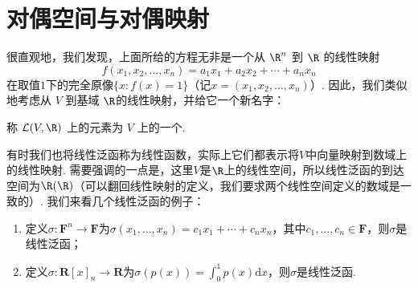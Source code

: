 






\section{对偶空间与对偶映射}

很直观地，我们发现，上面所给的方程无非是一个从 $\R^n$ 到 $\R$ 的线性映射
\[f(x_1, x_2, \ldots, x_n) = a_1 x_1 + a_2 x_2 + \cdots + a_n x_n\]
在取值$1$下的完全原像$\{x: f(x) = 1\}$（记$x=(x_1,x_2,\ldots,x_n)$）. 因此，我们类似地考虑从 $V$ 到基域 $\R$的线性映射，并给它一个新名字：

\begin{definition}{}{}
    称 $\mathcal{L}(V, \R)$ 上的元素为 $V$ 上的一个.
\end{definition}
有时我们也将线性泛函称为线性函数，实际上它们都表示将$V$中向量映射到数域上的线性映射. 需要强调的一点是，这里$V$是$\R$上的线性空间，所以线性泛函的到达空间为$\R(\R)$（可以翻回线性映射的定义，我们要求两个线性空间定义的数域是一致的）. 我们来看几个线性泛函的例子：
\begin{enumerate}
    \item 定义$\sigma:\mathbf{F}^n\to\mathbf{F}$为$\sigma(x_1,\ldots,x_n)=c_1x_1+\cdots+c_nx_n$，其中$c_1,\ldots,c_n\in\mathbf{F}$，则$\sigma$是线性泛函；

    \item 定义$\sigma:\mathbf{R}[x]_n\to\mathbf{R}$为$\sigma(p(x))=\displaystyle\int_0^1p(x)\mathrm{d}x$，则$\sigma$是线性泛函.
\end{enumerate}

